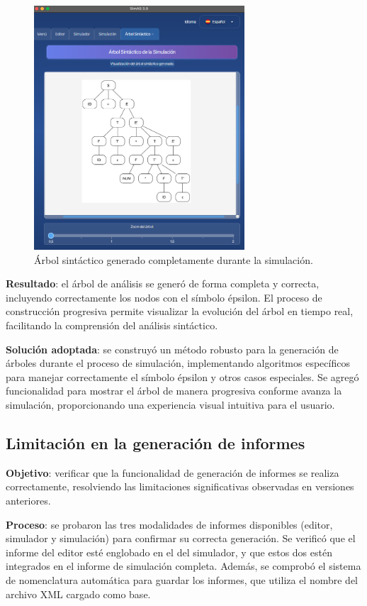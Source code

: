\needspace{6cm}
\begin{figure}[H]
  \centering
  \includegraphics[width=0.7\textwidth]{figuras2/pruebas/simulador/arbol.png}
  \caption{Árbol sintáctico generado completamente durante la simulación.}
\end{figure}

\textbf{Resultado}: el árbol de análisis se generó de forma completa y correcta, incluyendo correctamente los nodos con el símbolo épsilon. El proceso de construcción progresiva permite visualizar la evolución del árbol en tiempo real, facilitando la comprensión del análisis sintáctico.
\medskip

\textbf{Solución adoptada}: se construyó un método robusto para la generación de árboles durante el proceso de simulación, implementando algoritmos específicos para manejar correctamente el símbolo épsilon y otros casos especiales. Se agregó funcionalidad para mostrar el árbol de manera progresiva conforme avanza la simulación, proporcionando una experiencia visual intuitiva para el usuario.

\subsection{Limitación en la generación de informes}

\textbf{Objetivo}: verificar que la funcionalidad de generación de informes se realiza correctamente, resolviendo las limitaciones significativas observadas en versiones anteriores.
\medskip

\textbf{Proceso}: se probaron las tres modalidades de informes disponibles (editor, simulador y simulación) para confirmar su correcta generación. Se verificó que el informe del editor esté englobado en el del simulador, y que estos dos estén integrados en el informe de simulación completa. Además, se comprobó el sistema de nomenclatura automática para guardar los informes, que utiliza el nombre del archivo XML cargado como base.
\medskip

